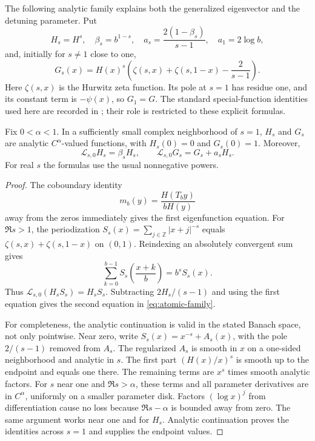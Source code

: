\documentclass[11pt,a4paper]{article}
\numberwithin{equation}{section}
\theoremstyle{definition}
\theoremstyle{remark}
\newcommand{\ZZ}{\mathbb Z}
\newcommand{\Lop}{\mathcal L}
\begin{document}
The following analytic family explains both the generalized eigenvector
and the detuning parameter. Put
\begin{equation}
 H_s=H^s,\quad \beta_s=b^{1-s},\quad
 a_s=\frac{2(1-\beta_s)}{s-1},\quad a_1=2\log b,
 \label{eq:family-constants}
\end{equation}
and, initially for $s\ne1$ close to one,
\begin{equation}
 G_s(x)=H(x)^s\left(\zeta(s,x)+\zeta(s,1-x)-\frac{2}{s-1}\right).
 \label{eq:Gs}
\end{equation}
Here $\zeta(s,x)$ is the Hurwitz zeta function. Its pole at $s=1$ has
residue one, and its constant term is $-\psi(x)$, so $G_1=G$.
The standard special-function identities used here are recorded in
\cite{DLMF}; their role is restricted to these explicit formulas.

\begin{lemma}
\label{lem:atomic-family}
Fix $0<\alpha<1$. In a sufficiently small complex neighborhood of $s=1$,
$H_s$ and $G_s$ are analytic $C^\alpha$-valued functions, with
$H_s(0)=0$ and $G_s(0)=1$. Moreover,
\begin{equation}
 \Lop_{s,0}H_s=\beta_sH_s,\qquad
 \Lop_{s,0}G_s=G_s+a_sH_s.
 \label{eq:atomic-family}
\end{equation}
For real $s$ the formulas use the usual nonnegative powers.
\end{lemma}
\begin{proof}
The coboundary identity
\begin{equation}
 m_b(y)=\frac{H(T_by)}{bH(y)}
 \label{eq:coboundary}
\end{equation}
away from the zeros immediately gives the first eigenfunction equation.
For $\Re s>1$, the periodization
$S_s(x)=\sum_{j\in\ZZ}|x+j|^{-s}$ equals
$\zeta(s,x)+\zeta(s,1-x)$ on $(0,1)$. Reindexing an absolutely convergent
sum gives
\[
 \sum_{k=0}^{b-1}S_s\left(\frac{x+k}{b}\right)=b^sS_s(x).
\]
Thus $\Lop_{s,0}(H_sS_s)=H_sS_s$. Subtracting
$2H_s/(s-1)$ and using the first equation gives the second equation in
\cref{eq:atomic-family}.

For completeness, the analytic continuation is valid in the stated
Banach space, not only pointwise. Near zero, write
$S_s(x)=x^{-s}+A_s(x)$, with the pole $2/(s-1)$ removed from $A_s$.
The regularized $A_s$ is smooth in $x$ on a one-sided neighborhood and
analytic in $s$. The first part
$(H(x)/x)^s$ is smooth up to the endpoint and equals one there.
The remaining terms are $x^s$ times smooth analytic factors. For $s$
near one and $\Re s>\alpha$, these terms and all parameter derivatives
are in $C^\alpha$, uniformly on a smaller parameter disk. Factors
$(\log x)^j$ from differentiation cause no loss because
$\Re s-\alpha$ is bounded away from zero. The same argument works near
one and for $H_s$. Analytic continuation proves the identities across
$s=1$ and supplies the endpoint values.
\end{proof}
\end{document}
